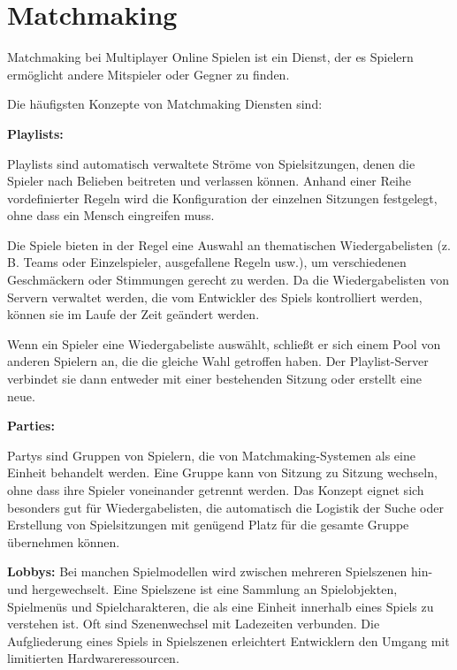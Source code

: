 \cite{Smed.2002c}


\section{Matchmaking}

Matchmaking bei Multiplayer Online Spielen ist ein Dienst, der es Spielern ermöglicht andere Mitspieler oder Gegner zu finden. \cite{.2014}

Die häufigsten Konzepte von Matchmaking Diensten sind:

\textbf{Playlists:}

Playlists sind automatisch verwaltete Ströme von Spielsitzungen, denen die Spieler nach Belieben beitreten und verlassen können. Anhand einer Reihe vordefinierter Regeln wird die Konfiguration der einzelnen Sitzungen festgelegt, ohne dass ein Mensch eingreifen muss.  

Die Spiele bieten in der Regel eine Auswahl an thematischen Wiedergabelisten (z. B. Teams oder Einzelspieler, ausgefallene Regeln usw.), um verschiedenen Geschmäckern oder Stimmungen gerecht zu werden. Da die Wiedergabelisten von Servern verwaltet werden, die vom Entwickler des Spiels kontrolliert werden, können sie im Laufe der Zeit geändert werden.

Wenn ein Spieler eine Wiedergabeliste auswählt, schließt er sich einem Pool von anderen Spielern an, die die gleiche Wahl getroffen haben. Der Playlist-Server verbindet sie dann entweder mit einer bestehenden Sitzung oder erstellt eine neue. 

\cite{Wikipedia.2021b}

\textbf{Parties:}

Partys sind Gruppen von Spielern, die von Matchmaking-Systemen als eine Einheit behandelt werden. Eine Gruppe kann von Sitzung zu Sitzung wechseln, ohne dass ihre Spieler voneinander getrennt werden. Das Konzept eignet sich besonders gut für Wiedergabelisten, die automatisch die Logistik der Suche oder Erstellung von Spielsitzungen mit genügend Platz für die gesamte Gruppe übernehmen können.

\cite{Wikipedia.2021b} 

\textbf{Lobbys:}
Bei manchen Spielmodellen wird zwischen mehreren Spielszenen hin-und hergewechselt. Eine Spielszene ist eine Sammlung an Spielobjekten, Spielmenüs und Spielcharakteren, die als eine Einheit innerhalb eines Spiels zu verstehen ist. Oft sind Szenenwechsel mit Ladezeiten verbunden. Die Aufgliederung eines Spiels in Spielszenen erleichtert Entwicklern den Umgang mit limitierten Hardwareressourcen. \cite{Wikipedia.2012}


